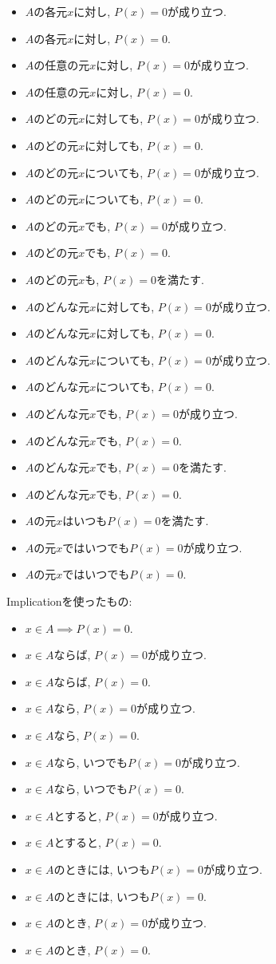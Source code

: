 \documentclass[a4paper,12pt,draft]{amsart}
\begin{document}
\begin{itemize}
\item $A$の各元$x$に対し, $P(x)=0$が成り立つ.
\item $A$の各元$x$に対し, $P(x)=0$.
\item $A$の任意の元$x$に対し, $P(x)=0$が成り立つ.
\item $A$の任意の元$x$に対し, $P(x)=0$.
\item $A$のどの元$x$に対しても, $P(x)=0$が成り立つ.
\item $A$のどの元$x$に対しても, $P(x)=0$.
\item $A$のどの元$x$についても, $P(x)=0$が成り立つ.
\item $A$のどの元$x$についても, $P(x)=0$.
\item $A$のどの元$x$でも, $P(x)=0$が成り立つ.
\item $A$のどの元$x$でも, $P(x)=0$.
\item $A$のどの元$x$も, $P(x)=0$を満たす.
\item $A$のどんな元$x$に対しても, $P(x)=0$が成り立つ.
\item $A$のどんな元$x$に対しても, $P(x)=0$.
\item $A$のどんな元$x$についても, $P(x)=0$が成り立つ.
\item $A$のどんな元$x$についても, $P(x)=0$.
\item $A$のどんな元$x$でも, $P(x)=0$が成り立つ.
\item $A$のどんな元$x$でも, $P(x)=0$.
\item $A$のどんな元$x$でも, $P(x)=0$を満たす.
\item $A$のどんな元$x$でも, $P(x)=0$.
\item $A$の元$x$はいつも$P(x)=0$を満たす.
\item $A$の元$x$ではいつでも$P(x)=0$が成り立つ.
\item $A$の元$x$ではいつでも$P(x)=0$.
\end{itemize}
Implicationを使ったもの:
\begin{itemize}
\item $x \in A\implies P(x)=0$.
\item $x\in A$ならば, $P(x)=0$が成り立つ.
\item $x\in A$ならば, $P(x)=0$.
\item $x\in A$なら, $P(x)=0$が成り立つ.
\item $x\in A$なら, $P(x)=0$.
\item $x\in A$なら, いつでも$P(x)=0$が成り立つ.
\item $x\in A$なら, いつでも$P(x)=0$.
\item $x\in A$とすると, $P(x)=0$が成り立つ.
\item $x\in A$とすると, $P(x)=0$.
\item $x\in A$のときには, いつも$P(x)=0$が成り立つ.
\item $x\in A$のときには, いつも$P(x)=0$.
\item $x\in A$のとき, $P(x)=0$が成り立つ.
\item $x\in A$のとき, $P(x)=0$.
\end{itemize}
\end{document}
